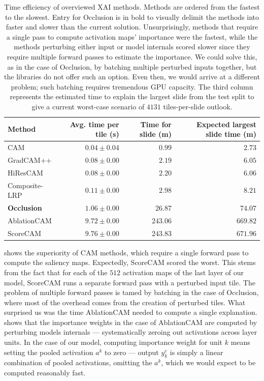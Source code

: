 \begin{table}
\centering
{}
\begin{tabular}{@{} l r r r @{}}\toprule
Method & Avg. time per tile (s) & Time for slide (m) & Expected largest slide time (m) \\ 
\midrule
CAM           & $0.04 \pm 0.04$ & $0.99$    & $2.73$ \\
GradCAM++     & $0.08 \pm 0.00$ & $2.19$   & $6.05$ \\
HiResCAM      & $0.08 \pm 0.00$ & $2.20$   & $6.06$ \\
Composite-LRP & $0.11 \pm 0.00$ & $2.98$  & $8.21$ \\
\textbf{Occlusion}     & $1.06 \pm 0.00$ & $26.87$  & $74.07$ \\
AblationCAM   & $9.72 \pm 0.00$ & $243.06$ & $669.82$ \\
ScoreCAM      & $9.76 \pm 0.00$ & $243.83$ & $671.96$ \\
\bottomrule
\end{tabular}
\caption{
Time efficiency of overviewed XAI methods.
Methods are ordered from the fastest to the slowest.
Entry for Occlusion is in bold to visually delimit the methods into faster and slower than the current solution.
Unsurprisingly, methods that require a single pass to compute activation maps' importance were the fastest, while the methods perturbing either input or model internals scored slower since they require multiple forward passes to estimate the importance.
We could solve this, as in the case of Occlusion, by batching multiple perturbed inputs together, but the libraries do not offer such an option.
Even then, we would arrive at a different problem; such batching requires tremendous GPU capacity.
The third column represents the estimated time to explain the largest slide from the test split to give a current worst-case scenario of $4131$ tiles-per-slide outlook.
}
\label{tab:comp-time}
\end{table}

 shows the superiority of CAM methods, which require a single forward pass to compute the saliency maps.
Expectedly, ScoreCAM scored the worst.
This stems from the fact that for each of the $512$ activation maps of the last layer of our model, ScoreCAM runs a separate forward pass with a perturbed input tile.
The problem of multiple forward passes is tamed by batching in the case of Occlusion, where most of the overhead comes from the creation of perturbed tiles.
What surprised us was the time AblationCAM needed to compute a single explanation.
 shows that the importance weights in the case of AblationCAM are computed by perturbing models internals --- systematically zeroing out activations across layer units.
In the case of our model, computing importance weight for unit $k$ means setting the pooled activation $a^k$ to zero --- output $y^c_k$ is simply a linear combination of pooled activations, omitting the $a^k$, which we would expect to be computed reasonably fast.

